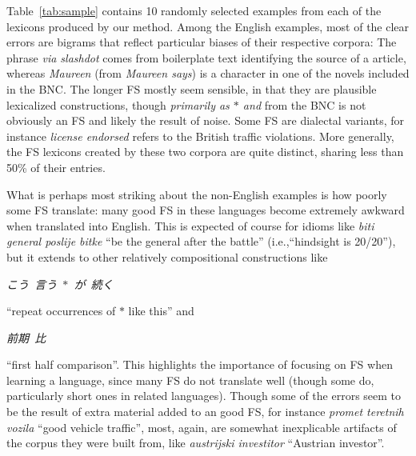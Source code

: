 \documentclass[11pt,letterpaper]{article}
\makeatletter
\def \ie {i.e.,\@ }
\newcommand{\gap}{$*$\xspace}
\newcommand{\ex}[1]{\textit{#1}\xspace}
\newcommand{\gl}[1]{``#1''\xspace}
\newcommand{\tabref}[2][]{Table#1~\ref{#2}\xspace}
\makeatother
\begin{document}
\tabref{tab:sample} contains 10 randomly selected examples from each of the lexicons produced by our method. Among the English examples, most of the clear errors are bigrams that reflect particular biases of their respective corpora: The phrase \ex{via slashdot} comes from boilerplate text identifying the source of a article, whereas \ex{Maureen} (from \ex{Maureen says}) is a character in one of the novels included in the BNC. The longer FS mostly seem sensible, in that they are plausible lexicalized constructions, though \ex{primarily as \gap and} from the BNC is not obviously an FS and likely the result of noise. Some FS are dialectal variants, for instance \ex{license endorsed} refers to the British traffic violations. More generally, the FS lexicons created by these two corpora are quite distinct, sharing less than 50\% of their entries.

What is perhaps most striking about the non-English examples is how poorly some FS translate: many good FS in these languages become extremely awkward when translated into English. This is expected of course for idioms like \ex{biti general poslije bitke} \gl{be the general after the battle} (\ie \gl{hindsight is 20/20}), but it extends to other relatively compositional  constructions like 
\begin{CJK*}{UTF8}{min} \ex{こう\ 言う\ \gap\ が\ 続く} \end{CJK*} \gl{repeat occurrences of \gap like this} and 
\begin{CJK*}{UTF8}{min} \ex{前期\ 比} \end{CJK*} 
\gl{first half comparison}. This highlights the importance of focusing on FS when learning a language, since many FS do not translate well (though some do, particularly short ones in related languages). Though some of the errors seem to be the result of extra material added to an good FS, for instance \ex{promet teretnih vozila} \gl{good vehicle traffic}, most, again, are somewhat inexplicable artifacts of the corpus they were built from, like \ex{austrijski investitor} \gl{Austrian investor}.
\end{document}
